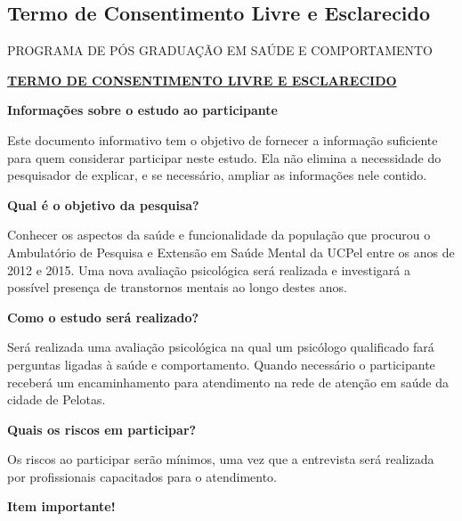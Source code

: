 \documentclass[chapter=TITLE,
               oneside,
               12pt,
               a4paper,
               english,
               brazil]{abntex2}    %
\begin{document}
\anexos

\begin{anexosenv}

    \chapter{Termo de Consentimento Livre e Esclarecido}

        \begin{center}

            \MakeUppercase\imprimirinstituicao

            PROGRAMA DE PÓS GRADUAÇÃO EM SAÚDE E COMPORTAMENTO
            
            \textbf{\underline{TERMO DE CONSENTIMENTO LIVRE E ESCLARECIDO}}

        \end{center}

        {\parindent0pt

        \textbf{Informações sobre o estudo ao participante}

        Este documento informativo tem o objetivo de fornecer a informação
        suficiente para quem considerar participar neste estudo.
        Ela não elimina a necessidade do pesquisador de explicar, e se
        necessário, ampliar as informações nele contido.

        \textbf{Qual é o objetivo da pesquisa?}

        Conhecer os aspectos da saúde e funcionalidade da população que procurou
        o Ambulatório de Pesquisa e Extensão em Saúde Mental da UCPel entre os
        anos de 2012 e 2015. Uma nova avaliação psicológica será realizada e
        investigará a possível presença de transtornos mentais ao longo destes
        anos.

        \textbf{Como o estudo será realizado?}

        Será realizada uma avaliação psicológica na qual um psicólogo qualificado
        fará perguntas ligadas à saúde e comportamento. Quando necessário o
        participante receberá um encaminhamento para atendimento na rede de
        atenção em saúde da cidade de Pelotas.

        \textbf{Quais os riscos em participar?}

        Os riscos ao participar serão mínimos, uma vez que a entrevista será
        realizada por profissionais capacitados para o atendimento.
        
        \textbf{Item importante!}

}
\end{anexosenv}
\end{document}

